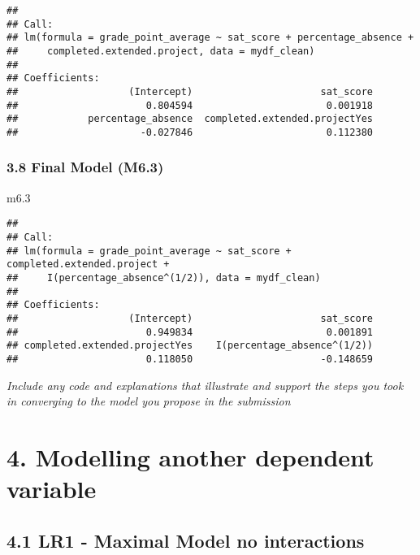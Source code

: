 \documentclass[
]{article}
\newenvironment{Shaded}{\begin{snugshade}}{\end{snugshade}}
\newcommand{\FloatTok}[1]{\textcolor[rgb]{0.00,0.00,0.81}{#1}}
\newcommand{\NormalTok}[1]{#1}
\begin{document}
\begin{verbatim}
## 
## Call:
## lm(formula = grade_point_average ~ sat_score + percentage_absence + 
##     completed.extended.project, data = mydf_clean)
## 
## Coefficients:
##                   (Intercept)                      sat_score  
##                      0.804594                       0.001918  
##            percentage_absence  completed.extended.projectYes  
##                     -0.027846                       0.112380
\end{verbatim}

\subsubsection{3.8 Final Model (M6.3)}\label{final-model-m6.3}

\begin{Shaded}
\begin{Highlighting}[]
\NormalTok{m6}\FloatTok{.3}
\end{Highlighting}
\end{Shaded}

\begin{verbatim}
## 
## Call:
## lm(formula = grade_point_average ~ sat_score + completed.extended.project + 
##     I(percentage_absence^(1/2)), data = mydf_clean)
## 
## Coefficients:
##                   (Intercept)                      sat_score  
##                      0.949834                       0.001891  
## completed.extended.projectYes    I(percentage_absence^(1/2))  
##                      0.118050                      -0.148659
\end{verbatim}

\emph{Include any code and explanations that illustrate and support the
steps you took in converging to the model you propose in the submission}

\section{4. Modelling another dependent
variable}\label{modelling-another-dependent-variable}

\subsection{4.1 LR1 - Maximal Model no
interactions}\label{lr1---maximal-model-no-interactions}
\end{document}
